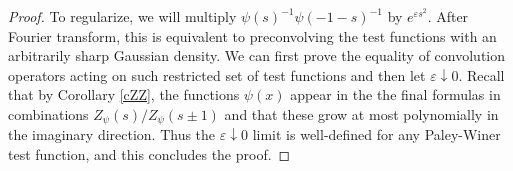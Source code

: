 \documentclass[14pt]{extarticle}
\newcommand{\bA}{\mathsf{A}}
\newcommand{\bG}{\mathsf{G}}
\newcommand{\cT}{\mathscr{T}}
\newcommand{\fb}{\mathfrak{b}}
\DeclareMathOperator{\Lie}{Lie}
\newtheorem{Proposition}[Lemma]{Proposition}
\newtheorem{Corollary}[Lemma]{Corollary}
\theoremstyle{definition}
\begin{document}
\begin{proof}
To regularize,
we will multiply $\psi(s)^{-1} \psi(-1-s)^{-1}$  by $e^{\varepsilon
  s^2}$. After Fourier transform, this is equivalent to preconvolving
the test functions with an arbitrarily sharp Gaussian density. 
We can first prove the equality of convolution operators acting
on such restricted set of test functions and then let $\varepsilon
\downarrow 0$. Recall that by Corollary \ref{cZZ}, 
the functions $\psi(x)$ appear in the the final formulas  in
combinations $Z_\psi(s)/Z_\psi(s\pm 1)$ and that these grow
at most polynomially in the imaginary direction. Thus the
$\varepsilon \downarrow 0$  limit is well-defined for any
Paley-Winer test function, and this concludes the proof. 
\end{proof}






\end{document}
